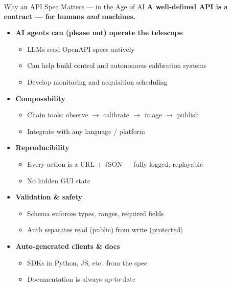 \documentclass[ignorenonframetext]{beamer}
\begin{document}
\begin{frame}{Why an API Spec Matters --- in the Age of AI}
	\textbf{A well-defined API is a contract --- for humans \emph{and} machines.}

	\vspace{0.3cm}
	\begin{itemize}
		\item \textbf{AI agents can (please not) operate the telescope}
		      \begin{itemize}
			      \item LLMs read OpenAPI specs natively
			      \item Can help build control and autonomous calibration systems
			      \item Develop monitoring and acquisition scheduling
		      \end{itemize}
		\item \textbf{Composability}
		      \begin{itemize}
			      \item Chain tools: observe $\rightarrow$ calibrate $\rightarrow$ image $\rightarrow$ publish
			      \item Integrate with any language / platform
		      \end{itemize}
		\item \textbf{Reproducibility}
		      \begin{itemize}
			      \item Every action is a URL + JSON --- fully logged, replayable
			      \item No hidden GUI state
		      \end{itemize}
		\item \textbf{Validation \& safety}
		      \begin{itemize}
			      \item Schema enforces types, ranges, required fields
			      \item Auth separates read (public) from write (protected)
		      \end{itemize}
		\item \textbf{Auto-generated clients \& docs}
		      \begin{itemize}
			      \item SDKs in Python, JS, etc.\ from the spec
			      \item Documentation is always up-to-date
		      \end{itemize}
	\end{itemize}
\end{frame}
\end{document}
